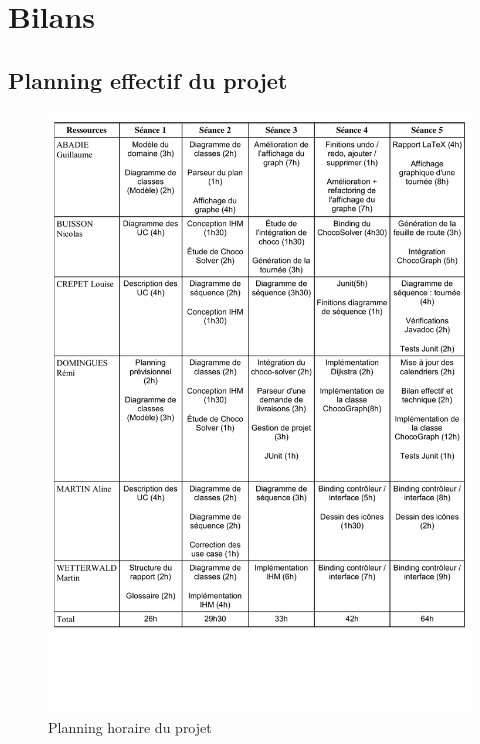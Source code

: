 \chapter{Bilans}

\section{Planning effectif du projet}

\begin{figure}[h]
    \centering
    \includegraphics[width=130mm]{../diagrams/project_management/planning_effectif/planning_horaire.pdf}
    \caption{Planning horaire du projet}
    \label{diagram:planning_horaire}
\end{figure}
\pagebreak

